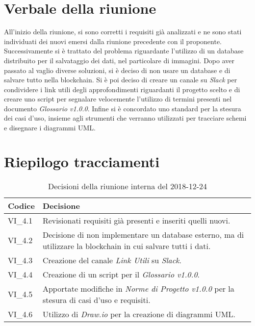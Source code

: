 \section{Verbale della riunione}
All'inizio della riunione, si sono corretti i requisiti già analizzati e ne sono 
stati individuati dei nuovi emersi dalla riunione precedente con il proponente.
Successivamente si è trattato del problema riguardante l'utilizzo di un database
distribuito per il salvataggio dei dati, nel particolare di immagini. Dopo aver
passato al vaglio diverse soluzioni, si è deciso di non usare un database e di 
salvare tutto nella blockchain\glo{}. \newline
Si è poi deciso di creare un canale su \textit{Slack} per condividere i link utili degli
approfondimenti riguardanti il progetto scelto e di creare uno script per segnalare
velocemente l'utilizzo di termini presenti nel documento \textit{Glossario v1.0.0}.
Infine si è concordato uno standard per la stesura dei casi d'uso, insieme agli 
strumenti che verranno utilizzati per tracciare schemi e disegnare i diagrammi UML.

\pagebreak

\section{Riepilogo tracciamenti}

	
		
	\begin{longtable}{ >{\centering}p{} >{}p{}}
		\caption{Decisioni della riunione interna del 2018-12-24}\\	
		\rowcolorhead
		\textbf{\color{white}Codice} 
		& \centering\textbf{\color{white}Decisione} 
		\tabularnewline 
		\endfirsthead
		
		VI\_4.1 & Revisionati requisiti già presenti e inseriti quelli nuovi.
		
		\tabularnewline 
		VI\_4.2 & Decisione di non implementare un database esterno, ma di utilizzare
					la blockchain in cui salvare tutti i dati.
		
		\tabularnewline 
		VI\_4.3 & Creazione del canale \textit{Link Utili} su \textit{Slack}.
	
		\tabularnewline 
		VI\_4.4 & Creazione di un script per il \textit{Glossario v1.0.0}.
		
		\tabularnewline
		VI\_4.5 & Apportate modifiche in \textit{Norme di Progetto v1.0.0} per la 
				stesura di casi d'uso e requisiti.
		
		\tabularnewline
		VI\_4.6 & Utilizzo di \textit{Draw.io} per la creazione di diagrammi UML.			
	
	\end{longtable}



